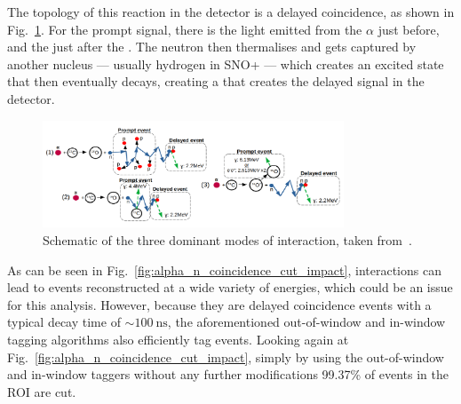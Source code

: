 The topology of this reaction in the detector is a delayed coincidence, as shown in Fig.~\ref{fig:alpha_n_drawing}. %
For the prompt signal, there is the light emitted from the $\alpha$ just before, and the  just after the \alphan{}. The neutron then thermalises and gets captured by another nucleus --- usually hydrogen in SNO+ --- which creates an excited state that then eventually decays, creating a \ce{\gamma} that creates the delayed signal in the detector.

\begin{figure}
    \centering
    \includegraphics[width=0.8\textwidth]{6_SolarAnalysis/images/alpha_n_schematic_Iwan_modified.pdf}
    \caption[Schematic of \alphan{} interactions.]{Schematic of the three dominant modes of \alphan{} interaction, taken from~\cite{morton-blakeFirstMeasurementReactor2021}. %
    }
    \label{fig:alpha_n_drawing}
\end{figure}

As can be seen in Fig.~\ref{fig:alpha_n_coincidence_cut_impact}, \alphan{} interactions can lead to events reconstructed at a wide variety of energies, which could be an issue for this analysis. However, because they are delayed coincidence events with a typical decay time of $\sim\SI{100}{\nano\second}$, the aforementioned out-of-window and in-window  tagging algorithms also efficiently tag \alphan{} events. Looking again at Fig.~\ref{fig:alpha_n_coincidence_cut_impact}, simply by using the out-of-window and in-window  taggers without any further modifications 99.37\% of events in the ROI are cut.

